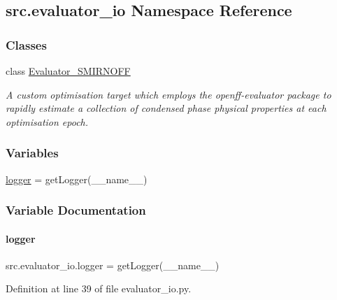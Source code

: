 \hypertarget{namespacesrc_1_1evaluator__io}{}\subsection{src.\+evaluator\+\_\+io Namespace Reference}
\label{namespacesrc_1_1evaluator__io}
\subsubsection*{Classes}
\begin{DoxyCompactItemize}
\item 
class \hyperlink{classsrc_1_1evaluator__io_1_1Evaluator__SMIRNOFF}{Evaluator\+\_\+\+S\+M\+I\+R\+N\+O\+FF}
\begin{DoxyCompactList}\small\item\em A custom optimisation target which employs the {\ttfamily openff-\/evaluator} package to rapidly estimate a collection of condensed phase physical properties at each optimisation epoch. \end{DoxyCompactList}\end{DoxyCompactItemize}
\subsubsection*{Variables}
\begin{DoxyCompactItemize}
\item 
\hyperlink{namespacesrc_1_1evaluator__io_a099f9d5752c1a25b590deb6b9f02fd69}{logger} = get\+Logger(\+\_\+\+\_\+name\+\_\+\+\_\+)
\end{DoxyCompactItemize}


\subsubsection{Variable Documentation}
\mbox{\label{namespacesrc_1_1evaluator__io_a099f9d5752c1a25b590deb6b9f02fd69}} 
\paragraph{\texorpdfstring{logger}{logger}}
{\footnotesize\ttfamily src.\+evaluator\+\_\+io.\+logger = get\+Logger(\+\_\+\+\_\+name\+\_\+\+\_\+)}



Definition at line 39 of file evaluator\+\_\+io.\+py.

